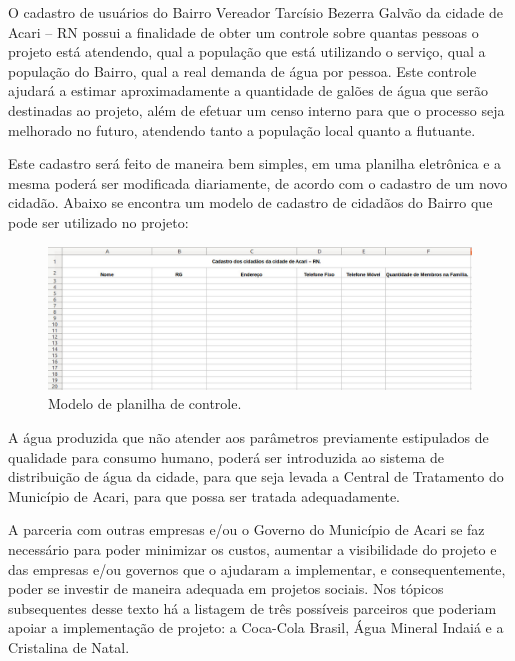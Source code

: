     O cadastro de usuários do Bairro Vereador Tarcísio Bezerra Galvão da cidade de Acari – RN possui a finalidade de obter um controle sobre quantas pessoas o projeto está atendendo, qual a população que está utilizando o serviço, qual a população do Bairro, qual a real demanda de água por pessoa. Este controle ajudará a estimar aproximadamente a quantidade de galões de água que serão destinadas ao projeto, além de efetuar um censo interno para que o processo seja melhorado no futuro, atendendo tanto a população local quanto a flutuante. 
    
    Este cadastro será feito de maneira bem simples, em uma planilha eletrônica e a mesma poderá ser modificada diariamente, de acordo com o cadastro de um novo cidadão. Abaixo se encontra um modelo de cadastro de cidadãos do Bairro que pode ser utilizado no projeto:
    
    \begin{figure}[!htbp]
      \centering
      \includegraphics[scale=0.35]{editaveis/figuras/modelo_planilha_controle}
      \caption[Modelo de planilha de controle]
      {Modelo de planilha de controle.}
      \label{modelo_planilha_controle}
    \end{figure}
    
    A água produzida que não atender aos parâmetros previamente estipulados de qualidade para consumo humano, poderá ser introduzida ao sistema de distribuição de água da cidade, para que seja levada a Central de Tratamento do Município de Acari, para que possa ser tratada adequadamente.
    
    A parceria com outras empresas e/ou o Governo do Município de Acari se faz necessário para poder minimizar os custos, aumentar a visibilidade do projeto e das empresas e/ou governos que o ajudaram a implementar, e consequentemente, poder se investir de maneira adequada em projetos sociais. Nos tópicos subsequentes desse texto há a listagem de três possíveis parceiros que poderiam apoiar a implementação de projeto: a Coca-Cola Brasil, Água Mineral Indaiá e a Cristalina de Natal.
    
